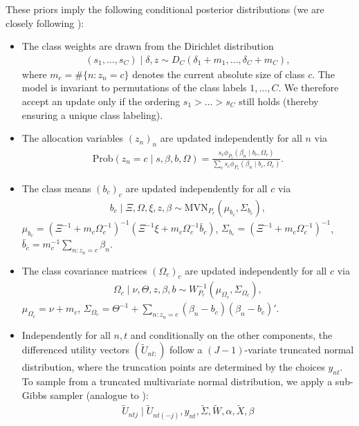 \documentclass[article,shortnames]{jss}
\begin{document}
These priors imply the following conditional posterior distributions (we are closely following \cite{Oelschlaeger:2020}):
\begin{itemize}
  \item The class weights are drawn from the Dirichlet distribution
  \begin{align*}
  (s_1,\dots,s_C)\mid \delta,z \sim D_C(\delta_1+m_1,\dots,\delta_C+m_C),
  \end{align*}
  where $m_c=\#\{n:z_n=c\}$ denotes the current absolute size of class $c$. The model is invariant to permutations of the class labels $1,\dots,C$. We therefore accept an update only if the ordering $s_1>\dots>s_C$ still holds (thereby ensuring a unique class labeling).
  \item The allocation variables $(z_n)_n$ are updated independently for all $n$ via
  \begin{align*}
  \text{Prob}(z_n=c\mid s,\beta,b,\Omega )=\frac{s_c\phi_{P_r}(\beta_n\mid b_c,\Omega_c)}{\sum_c s_c\phi_{P_r}(\beta_n\mid b_c,\Omega_c)}.
  \end{align*}
  \item The class means $(b_c)_c$ are updated independently for all $c$ via
  \begin{align*}
  b_c\mid \Xi,\Omega,\xi,z,\beta \sim\text{MVN}_{P_r}\left( \mu_{b_c}, \Sigma_{b_c}  \right),
  \end{align*}
  $\mu_{b_c}=(\Xi^{-1}+m_c\Omega_c^{-1})^{-1}(\Xi^{-1}\xi +m_c\Omega_c^{-1}\bar{b}_c)$, $\Sigma_{b_c}=(\Xi^{-1}+m_c\Omega_c^{-1})^{-1}$, $\bar{b}_c=m_c^{-1}\sum_{n:z_n=c} \beta_n$.
    \item The class covariance matrices $(\Omega_c)_c$ are updated independently for all $c$ via
  \begin{align*}
  \Omega_c \mid \nu,\Theta,z,\beta,b \sim W^{-1}_{P_r}(\mu_{\Omega_c},\Sigma_{\Omega_c}),
  \end{align*}
  $\mu_{\Omega_c}=\nu+m_c$, $\Sigma_{\Omega_c}=\Theta^{-1} + \sum_{n:z_n=c} (\beta_n-b_c)(\beta_n-b_c)'$.
  \item Independently for all $n,t$ and conditionally on the other components, the differenced utility vectors $(\tilde{U}_{nt:})$ follow a $(J-1)$-variate truncated normal distribution, where the truncation points are determined by the choices $y_{nt}$. To sample from a truncated multivariate normal distribution, we apply a sub-Gibbs sampler (analogue to \cite{Geweke:1998}):
  \begin{align*}
  \tilde{U}_{ntj} \mid \tilde{U}_{nt(-j)},y_{nt},\tilde{\Sigma},\tilde{W},\alpha,\tilde{X},\beta

\end{align*}
\end{itemize}
\end{document}
